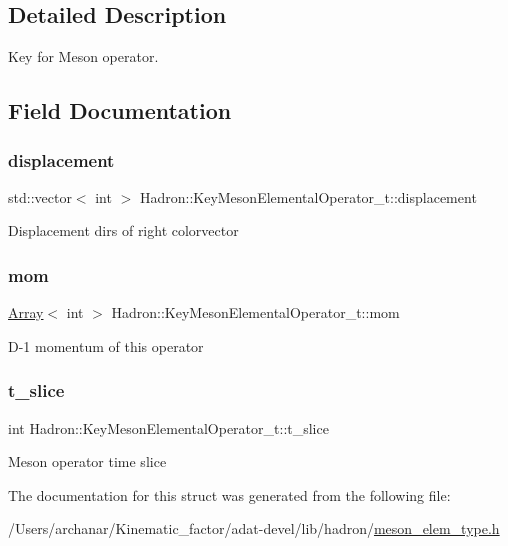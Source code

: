 \subsection{Detailed Description}
Key for Meson operator. 

\subsection{Field Documentation}
\mbox{\label{structHadron_1_1KeyMesonElementalOperator__t_ad634e00ae5b9c58fbe44e11e2df719c0}} 
\subsubsection{\texorpdfstring{displacement}{displacement}}
{\footnotesize\ttfamily std\+::vector$<$ int $>$ Hadron\+::\+Key\+Meson\+Elemental\+Operator\+\_\+t\+::displacement}

Displacement dirs of right colorvector \mbox{\label{structHadron_1_1KeyMesonElementalOperator__t_ab92553f02e0195a68148007008b0ef34}} 
\subsubsection{\texorpdfstring{mom}{mom}}
{\footnotesize\ttfamily \mbox{\hyperlink{classXMLArray_1_1Array}{Array}}$<$ int $>$ Hadron\+::\+Key\+Meson\+Elemental\+Operator\+\_\+t\+::mom}

D-\/1 momentum of this operator \mbox{\label{structHadron_1_1KeyMesonElementalOperator__t_ac241fd9a6af31e081d2582ce0389a3a4}} 
\subsubsection{\texorpdfstring{t\_slice}{t\_slice}}
{\footnotesize\ttfamily int Hadron\+::\+Key\+Meson\+Elemental\+Operator\+\_\+t\+::t\+\_\+slice}

Meson operator time slice 

The documentation for this struct was generated from the following file\+:\begin{DoxyCompactItemize}
\item 
/\+Users/archanar/\+Kinematic\+\_\+factor/adat-\/devel/lib/hadron/\mbox{\hyperlink{adat-devel_2lib_2hadron_2meson__elem__type_8h}{meson\+\_\+elem\+\_\+type.\+h}}\end{DoxyCompactItemize}
